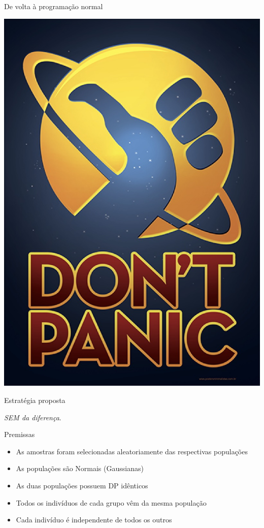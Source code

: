 \documentclass{beamer}
\begin{document}
\begin{frame}{\scriptsize De volta à programação normal}
  \begin{center}
    \includegraphics[height=.7\textheight]{Cap7/naoentreempanico}
  \end{center}
    \begin{block}{Estratégia proposta}
      \begin{center}
        {\em SEM da diferença}.
      \end{center}
  \end{block}
\end{frame}

\begin{frame}{\scriptsize Premissas}
  \begin{itemize}
    \footnotesize
  \item As amostras foram selecionadas aleatoriamente das respectivas populações
  \item As populações são Normais (Gaussianas)
  \item As duas populações possuem DP idênticos
  \item Todos os indivíduos de cada grupo vêm da mesma população
  \item Cada indivíduo é independente de todos os outros
  \end{itemize}
\end{frame}
\end{document}
